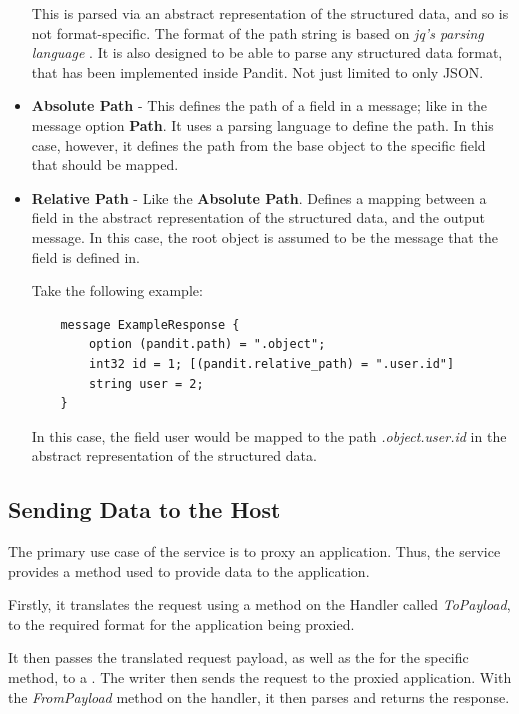 \documentclass[a4paper,12pt]{report}
\begin{document}
\begin{itemize}
    This is parsed via an abstract representation of the structured data, and so is not format-specific.
    The format of the path string is based on \textit{jq's parsing language} \cite{jq}. It is also designed to be able to parse any structured data format, that has been implemented inside Pandit. Not just limited to only JSON.
    
    
    \item \textbf{Absolute Path} - This defines the path of a field in a message; like in the message option \textbf{Path}. It uses a parsing language to define the path. In this case, however, it defines the path from the base object to the specific field that should be mapped.
    
    \item \textbf{Relative Path} - Like the \textbf{Absolute Path}. Defines a mapping between a field in the  abstract representation of the structured data, and the output message. In this case, the root object is assumed to be the message that the field is defined in. 
    
    Take the following example:
    \begin{lstlisting}
    message ExampleResponse {
        option (pandit.path) = ".object";
        int32 id = 1; [(pandit.relative_path) = ".user.id"]
        string user = 2;
    }
    \end{lstlisting}
    
    In this case, the field user would be mapped to the path \textit{.object.user.id} in the abstract representation of the structured data.
\end{itemize}

\subsection{Sending Data to the Host}

The primary use case of the service is to proxy an application. 
Thus, the service provides a method used to provide data to the application.

Firstly, it translates the request using a method on the Handler called \textit{ToPayload}, to the required format for the application being proxied.

It then passes the translated request payload, as well as the \textit{} for the specific method, to a \textit{}. 
The writer then sends the request to the proxied application. With the \textit{FromPayload} method on the handler, it then parses 
and returns the response.
\end{document}
